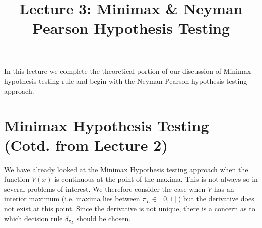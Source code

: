 \documentclass[a4paper,english,12pt]{article}
\title{Lecture 3: Minimax \& Neyman Pearson Hypothesis Testing}
\author{}
\begin{document}
\maketitle
In this lecture we complete the theoretical portion of our discussion of Minimax hypothesis testing rule and begin with the Neyman-Pearson hypothesis testing approach.

\section{Minimax Hypothesis Testing (Cotd. from Lecture 2)}
We have already looked at the Minimax Hypothesis testing approach when the function $V(x)$ is continuous at the point of the maxima. This is not always so in several problems of interest. We therefore consider the case when $V$ has an interior maximum (i.e. maxima lies between $\pi_{L} \in [0,1]$) but the derivative does not exist at this point. Since the derivative is not unique, there is a concern as to which decision rule $\delta_{\pi_{L}}$ should be chosen.
\end{document}
